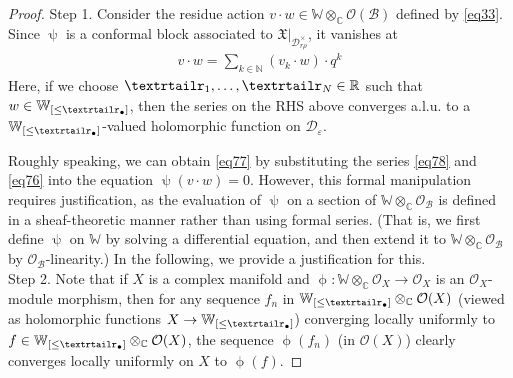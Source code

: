 \documentclass[11pt,b5paper,notitlepage]{article}
\theoremstyle{definition}
\theoremstyle{plain}
\newcommand{\blt}{\bullet}
\newcommand{\Wbb}{\mathbb W}
\newcommand{\Cbb}{\mathbb C}
\newcommand{\Nbb}{\mathbb N}
\newcommand{\Rbb}{\mathbb R}
\newcommand{\<}{\left\langle}
\renewcommand{\>}{\right\rangle}
\newcommand{\MO}{\mathcal{O}}
\newcommand{\MB}{\mathcal{B}}
\newcommand{\fx}{\mathfrak{X}}
\newcommand{\MD}{\mathcal{D}}
\newcommand{\eps}{\varepsilon}
\newcommand{\tipar}{\text{\textrtailr}}
\numberwithin{equation}{section}
\begin{document}
\begin{proof}
Step 1. Consider the residue action $v\cdot w\in\Wbb\otimes_\Cbb\MO(\MB)$ defined by \eqref{eq33}. Since $\uppsi$ is a conformal block associated to $\fx|_{\MD_{r\rho}^\times}$, it vanishes at
\begin{align}
v\cdot w=\sum_{k\in\Nbb}(v_k\cdot w)\cdot q^k  \label{eq76}
\end{align}
Here, if we choose $\tipar_1,\dots,\tipar_N\in\Rbb$ such that $w\in\Wbb_{[\leq \tipar_\blt]}$, then the series on the RHS above converges a.l.u. to a $\Wbb_{[\leq \tipar_\blt]}$-valued holomorphic function on $\MD_\eps$.




Roughly speaking, we can obtain \eqref{eq77} by substituting the series \eqref{eq78} and \eqref{eq76} into the equation $\uppsi(v\cdot w)=0$. However, this formal manipulation requires justification, as the evaluation of $\uppsi$ on a section of $\Wbb\otimes_\Cbb\MO_\MB$ is defined in a sheaf-theoretic manner rather than using formal series. (That is, we first define $\uppsi$ on $\Wbb$ by solving a differential equation, and then extend it to $\Wbb\otimes_\Cbb\MO_\MB$ by $\MO_\MB$-linearity.) In the following, we provide a justification for this.\\[-1ex]

Step 2. Note that if $X$ is a complex manifold and $\upphi:\Wbb\otimes_\Cbb\MO_X\rightarrow\MO_X$ is an $\MO_X$-module morphism, then for any sequence  $f_n$ in $\Wbb_{[\leq\tipar_\blt]}\otimes_\Cbb\MO(X)$ (viewed as holomorphic functions $X\rightarrow\Wbb_{[\leq\tipar_\blt]}$) converging locally uniformly to $f\in\Wbb_{[\leq\tipar_\blt]}\otimes_\Cbb\MO(X)$, the sequence $\upphi(f_n)$ (in $\MO(X)$) clearly converges locally uniformly on $X$ to $\upphi(f)$. 



\end{proof}
\end{document}
